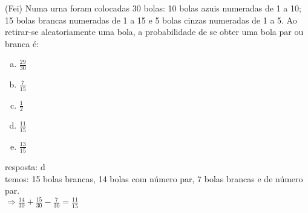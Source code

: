 \begin{ex}
(Fei) Numa urna foram colocadas 30  bolas: 10 bolas azuis numeradas de 1 a 10; 15 bolas brancas numeradas de 1 a 15 e 5 bolas cinzas numeradas de 1 a 5. Ao retirar-se aleatoriamente uma bola, a probabilidade de se obter uma bola par ou branca é:
   \begin{enumerate}[(a)]
   \item $\frac{29}{30}$
   \item $\frac{7}{15}$
   \item $\frac{1}{2}$
   \item $\frac{11}{15}$
   \item $\frac{13}{15}$
   \end{enumerate}
     \begin{sol}
      resposta: d \\
      temos:  15 bolas brancas, 14 bolas com número par, 7 bolas brancas e de número par. \\
      $\Longrightarrow \frac{14}{30}+\frac{15}{30}-\frac{7}{30}=\frac{11}{15}$
     \end{sol}
\end{ex}
